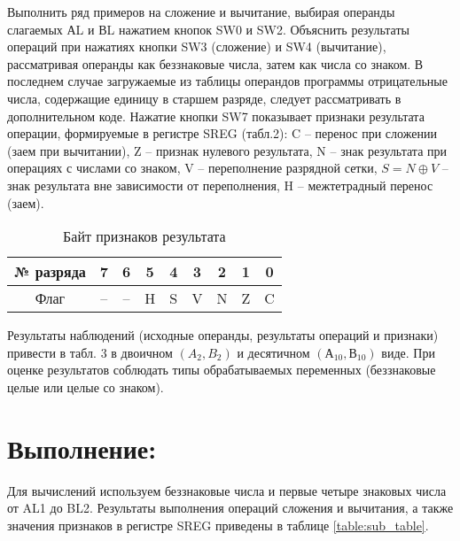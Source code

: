\documentclass{bmstu}
\begin{document}
Выполнить ряд примеров на сложение и вычитание, выбирая операнды слагаемых АL и ВL нажатием кнопок SW0 и SW2.
Объяснить результаты операций при нажатиях кнопки SW3 (сложение) и SW4 (вычитание), рассматривая операнды как 
беззнаковые числа, затем как числа со знаком. В последнем случае загружаемые из таблицы операндов программы 
отрицательные числа, содержащие единицу в старшем разряде, следует рассматривать в дополнительном коде. Нажатие 
кнопки SW7 показывает признаки результата операции, формируемые в регистре SREG (табл.2): C – перенос при сложении 
(заем при вычитании), Z – признак нулевого результата, N – знак результата при операциях с числами со знаком, V – 
переполнение разрядной сетки, $S=N \oplus V$ – знак результата вне зависимости от переполнения, H  – межтетрадный 
перенос (заем). 

\begin{center}
\begin{table}[H]
\caption{Байт признаков результата}
\label{table:flags_table}
\begin{tabular}{| c | c | c | c | c | c | c | c | c |}
	\hline
		№ разряда &7 & 6 & 5 & 4 & 3 & 2 & 1 & 0 \\
	\hline
		Флаг & -- & -- & H & S & V & N & Z & C \\
	\hline
\end{tabular}
\end{table}
\end{center}


Результаты наблюдений (исходные операнды, результаты операций и признаки) привести в табл. 3 в двоичном $(A_2, B_2)$ и десятичном $(А_10,В_10)$ виде. При оценке результатов соблюдать типы обрабатываемых переменных (беззнаковые целые или целые со знаком). \newline


\chapter{Выполнение:}
Для вычислений используем беззнаковые числа и первые четыре знаковых числа от AL1 до BL2. Результаты выполнения операций сложения и вычитания, а также значения признаков в регистре SREG приведены в таблице \ref{table:sub_table}.
\end{document}
